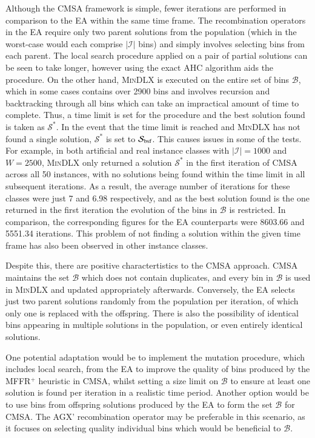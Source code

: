 \documentclass[authoryear]{elsarticle}
\begin{document}
Although the CMSA framework is simple, fewer iterations are performed in comparison to the EA within the same time frame. The recombination operators in the EA require only two parent solutions from the population (which in the worst-case would each comprise $|\mathcal{I}|$ bins) and simply involves selecting bins from each parent. The local search procedure applied on a pair of partial solutions can be seen to take longer, however using the exact AHC algorithm aids the procedure. On the other hand, \textsc{MinDLX} is executed on the entire set of bins $\mathcal{B}$, which in some cases contains over 2900 bins and involves recursion and backtracking through all bins which can take an impractical amount of time to complete. Thus, a time limit is set for the procedure and the best solution found is taken as $\mathcal{S}^*$. In the event that the time limit is reached and \textsc{MinDLX} has not found a single solution, $\mathcal{S}^*$ is set to $\mathcal{S}_{\textup{bsf}}$. This causes issues in some of the tests. For example, in both artificial and real instance classes with $|\mathcal{I}| = 1000$ and $W =2500$, \textsc{MinDLX} only returned a solution $\mathcal{S}^*$ in the first iteration of CMSA across all 50 instances, with no solutions being found within the time limit in all subsequent iterations. As a result, the average number of iterations for these classes were just 7 and 6.98 respectively, and as the best solution found is the one returned in the first iteration the evolution of the bins in $\mathcal{B}$ is restricted. In comparison, the corresponding figures for the EA counterparts were 8603.66 and 5551.34 iterations. This problem of not finding a solution within the given time frame has also been observed in other instance classes.

Despite this, there are positive charactertistics to the CMSA approach. CMSA maintains the set $\mathcal{B}$ which does not contain duplicates, and every bin in $\mathcal{B}$ is used in \textsc{MinDLX} and updated appropriately afterwards. Conversely, the EA selects just two parent solutions randomly from the population per iteration, of which only one is replaced with the offspring. There is also the possibility of identical bins appearing in multiple solutions in the population, or even entirely identical solutions. 

One potential adaptation would be to implement the mutation procedure, which includes local search, from the EA to improve the quality of bins produced by the MFFR$^+$ heuristic in CMSA, whilst setting a size limit on $\mathcal{B}$ to ensure at least one solution is found per iteration in a realistic time period. Another option would be to use bins from offspring solutions produced by the EA to form the set $\mathcal{B}$ for CMSA. The AGX' recombination operator may be preferable in this scenario, as it focuses on selecting quality individual bins which would be beneficial to $\mathcal{B}$.
\end{document}

